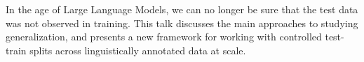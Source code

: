 In the age of Large Language Models, we can no longer be sure that the test data was not observed in training. 
This talk discusses the main approaches to studying generalization, and presents a new framework for working with controlled test-train splits across linguistically annotated data at scale.
